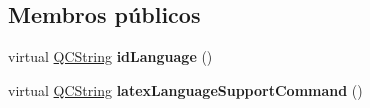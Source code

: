 \subsection*{Membros públicos}
\begin{DoxyCompactItemize}
\item 
\hypertarget{class_translator_slovak_a903bf0b486fd16dfbc84606e8474ff84}{virtual \hyperlink{class_q_c_string}{Q\-C\-String} {\bfseries id\-Language} ()}\label{class_translator_slovak_a903bf0b486fd16dfbc84606e8474ff84}

\item 
\hypertarget{class_translator_slovak_a38858830a8a30ed8dd67927882d27ff3}{virtual \hyperlink{class_q_c_string}{Q\-C\-String} {\bfseries latex\-Language\-Support\-Command} ()}\label{class_translator_slovak_a38858830a8a30ed8dd67927882d27ff3}


\end{DoxyCompactItemize}
